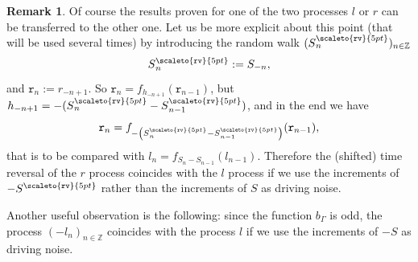 \documentclass[10pt]{amsart}
\theoremstyle{definition}\newtheorem{defi}[theo]{Definition}\newtheorem{rema}[theo]{Remark}\newtheorem{exam}[theo]{Example}\newtheorem{exem}[theo]{Example}\newtheorem{nota}[theo]{Notation}
\newcommand{\bbZ}{\mathbb{Z}}
\newcommand{\gG}{\Gamma}
\newcommand\mystrut{\rule{0pt}{6pt}}
\newcommand{\Srev}{S\mystrut^{\scaleto{\mathtt{rv}\mathstrut}{5pt}}}
\newcommand{\ttr}{\mathtt{r}}
\begin{document}
\begin{rema}\label{rem:time-reversal}
Of course the results proven for one of the two processes $l$ or $r$ can be transferred to the other one. Let us be more explicit about this point (that will be used several times) by introducing the random walk $(\Srev_n)_{n \in \bbZ}$
\begin{equation}\label{eq:Srev}
\Srev_n:= S_{-n},
\end{equation}
and $\ttr_{n}:= r_{-n+1}$. So $\ttr_n =f_{h_{-n+1}}(\ttr_{n-1})$, but $h_{-n+1}= -(
\Srev_n -\Srev_{n-1} )$, and in the end we have
\begin{equation}
\ttr_n = f_{ -\left(
\Srev_n -\Srev_{n-1} \right)}(\ttr_{n-1}),
\end{equation}
that is to be compared with $l_{n}= f_{S_n-S_{n-1}}(l_{n-1})$. Therefore the (shifted) time reversal of the $r$ process coincides with the $l$ process if we use the increments of $-\Srev$ rather than the increments of $S$ as driving noise.

Another useful observation is the following: since the function $b_\gG$ is odd, the process $(-l_n)_{n\in\bbZ}$ coincides with the process $l$ if we use the increments of $-S$ as driving noise.
\end{rema}
\end{document}
